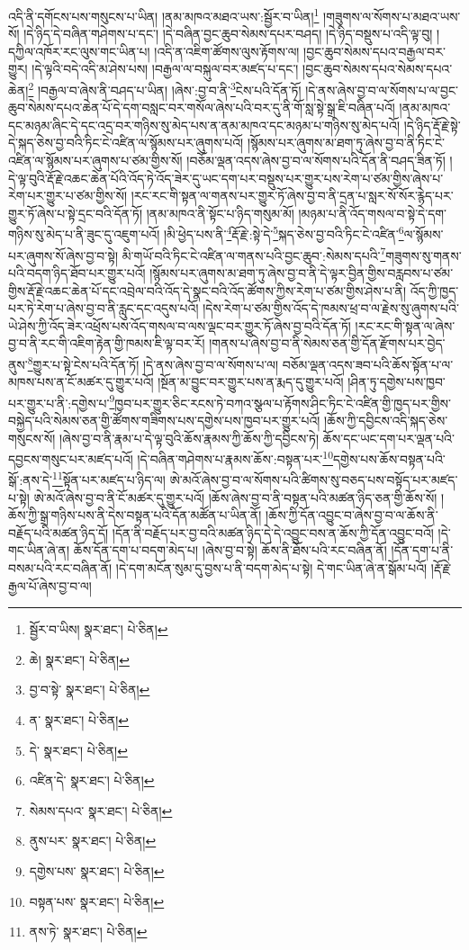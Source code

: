 འདི་ནི་དགོངས་པས་གསུངས་པ་ཡིན། །ནམ་མཁའ་མཐའ་ཡས་:སྦྱོར་བ་ཡིན།\footnote{སྦྱོར་བ་ཡིས།  སྣར་ཐང་།  པེ་ཅིན། } །གཟུགས་ལ་སོགས་པ་མཐའ་ཡས་སོ། །དེ་ཉིད་དེ་བཞིན་གཤེགས་པ་དང་། །དེ་བཞིན་བྱང་ཆུབ་སེམས་དཔར་བཤད། །དེ་ཉིད་བསྡུས་པ་འདི་ལྟ་བུ། །དཀྱིལ་འཁོར་རང་ལུས་གང་ཡིན་པ། །འདི་ན་འཇིག་ཚོགས་ལུས་རྟོགས་ལ། །བྱང་ཆུབ་སེམས་དཔའ་བརྒྱལ་བར་གྱུར། །དེ་ལྟའི་བདེ་འདི་མ་ཤེས་པས། །བརྒྱལ་ལ་བསྐུལ་བར་མཛད་པ་དང་། །བྱང་ཆུབ་སེམས་དཔའ་སེམས་དཔའ་ཆེན།\footnote{ཆེ།  སྣར་ཐང་།  པེ་ཅིན། } །བརྒྱལ་བ་ཞེས་ནི་བཤད་པ་ཡིན། །ཞེས་:བྱ་བ་ནི་\footnote{བྱ་བ་སྟེ་  སྣར་ཐང་།  པེ་ཅིན། }ངེས་པའི་དོན་ཏོ། །དེ་ནས་ཞེས་བྱ་བ་ལ་སོགས་པ་ལ་བྱང་ཆུབ་སེམས་དཔའ་ཆེན་པོ་དེ་དག་བསླང་བར་གསོལ་ཞེས་པའི་བར་དུ་ནི་གོ་སླ་སྟེ་སྒྲ་ཇི་བཞིན་པའོ། །ནམ་མཁའ་དང་མཉམ་ཞིང་དེ་དང་འདྲ་བར་གཉིས་སུ་མེད་པས་ན་ནམ་མཁའ་དང་མཉམ་པ་གཉིས་སུ་མེད་པའོ། །དེ་ཉིད་རྡོ་རྗེ་སྟེ་དེ་སྐད་ཅེས་བྱ་བའི་ཏིང་ངེ་འཛིན་ལ་སྙོམས་པར་ཞུགས་པའོ། །སྙོམས་པར་ཞུགས་མ་ཐག་ཏུ་ཞེས་བྱ་བ་ནི་ཏིང་ངེ་འཛིན་ལ་སྙོམས་པར་ཞུགས་པ་ཙམ་གྱིས་སོ། །བཅོམ་ལྡན་འདས་ཞེས་བྱ་བ་ལ་སོགས་པའི་དོན་ནི་བཤད་ཟིན་ཏོ། །དེ་ལྟ་བུའི་རྡོ་རྗེ་འཆང་ཆེན་པོའི་འོད་ཏེ་འོད་ཟེར་དུ་ཡང་དག་པར་བསྡུས་པར་གྱུར་པས་རེག་པ་ཙམ་གྱིས་ཞེས་པ་རེག་པར་གྱུར་པ་ཙམ་གྱིས་སོ། །རང་རང་གི་སྟན་ལ་གནས་པར་གྱུར་ཏོ་ཞེས་བྱ་བ་ནི་དྲན་པ་སླར་སོ་སོར་རྙེད་པར་གྱུར་ཏོ་ཞེས་པ་སྟེ་དྲང་བའི་དོན་ཏོ། །ནམ་མཁའ་ནི་སྟོང་པ་ཉིད་གསུམ་མོ། །མཉམ་པ་ནི་འོད་གསལ་བ་སྟེ་དེ་དག་གཉིས་སུ་མེད་པ་ནི་ཟུང་དུ་འཇུག་པའོ། །མི་ཕྱེད་པས་ནི་\footnote{ན་  སྣར་ཐང་།  པེ་ཅིན། }རྡོ་རྗེ་:སྟེ་དེ་\footnote{དེ་  སྣར་ཐང་།  པེ་ཅིན། }སྐད་ཅེས་བྱ་བའི་ཏིང་ངེ་འཛིན་\footnote{འཛིན་དེ་  སྣར་ཐང་།  པེ་ཅིན། }ལ་སྙོམས་པར་ཞུགས་སོ་ཞེས་བྱ་བ་སྟེ། མི་གཡོ་བའི་ཏིང་ངེ་འཛིན་ལ་གནས་པའི་བྱང་ཆུབ་:སེམས་དཔའི་\footnote{སེམས་དཔའ་  སྣར་ཐང་།  པེ་ཅིན། }གཟུགས་སུ་གནས་པའི་བདག་ཉིད་ཐོབ་པར་གྱུར་པའོ། །སྙོམས་པར་ཞུགས་མ་ཐག་ཏུ་ཞེས་བྱ་བ་ནི་དེ་ལྟར་བྱིན་གྱིས་བརླབས་པ་ཙམ་གྱིས་རྡོ་རྗེ་འཆང་ཆེན་པོ་དང་འབྲེལ་བའི་འོད་དེ་སྣང་བའི་འོད་ཚོགས་ཀྱིས་རེག་པ་ཙམ་གྱིས་ཤེས་པ་ནི། འོད་ཀྱི་ཁྱད་པར་ཏེ་རེག་པ་ཞེས་བྱ་བ་ནི་རླུང་དང་འདུས་པའོ། །དེས་རེག་པ་ཙམ་གྱིས་འོད་དེ་ཁམས་ཕྲ་བ་ལ་རྗེས་སུ་ཞུགས་པའི་ཡེ་ཤེས་ཀྱི་འོད་ཟེར་འཕྲོས་པས་འོད་གསལ་བ་ལས་ལྡང་བར་གྱུར་ཏོ་ཞེས་བྱ་བའི་དོན་ཏོ། །རང་རང་གི་སྟན་ལ་ཞེས་བྱ་བ་ནི་རང་གི་འཇིག་རྟེན་གྱི་ཁམས་ཇི་ལྟ་བར་རོ། །གནས་པ་ཞེས་བྱ་བ་ནི་སེམས་ཅན་གྱི་དོན་རྫོགས་པར་བྱེད་ནུས་\footnote{ནུས་པར་  སྣར་ཐང་།  པེ་ཅིན། }གྱུར་པ་སྟེ་ངེས་པའི་དོན་ཏོ། །དེ་ནས་ཞེས་བྱ་བ་ལ་སོགས་པ་ལ། བཅོམ་ལྡན་འདས་ཟབ་པའི་ཆོས་སྟོན་པ་ལ་མཁས་པས་ན་ངོ་མཚར་དུ་གྱུར་པའོ། །སྔོན་མ་བྱུང་བར་གྱུར་པས་ན་རྨད་དུ་གྱུར་པའོ། །ཤིན་ཏུ་དགྱེས་པས་ཁྱབ་པར་གྱུར་པ་ནི་:དགྱེས་པ་\footnote{དགྱེས་པས་  སྣར་ཐང་།  པེ་ཅིན། }ཁྱབ་པར་གྱུར་ཅིང་རངས་ཏེ་བཀའ་སྩལ་པ་རྟོགས་ཤིང་ཏིང་ངེ་འཛིན་གྱི་ཁྱད་པར་གྱིས་བསྐྱེད་པའི་སེམས་ཅན་གྱི་ཚོགས་གཟིགས་པས་དགྱེས་པས་ཁྱབ་པར་གྱུར་པའོ། །ཆོས་ཀྱི་དབྱིངས་འདི་སྐད་ཅེས་གསུངས་སོ། །ཞེས་བྱ་བ་ནི་རྣམ་པ་དེ་ལྟ་བུའི་ཆོས་རྣམས་ཀྱི་ཆོས་ཀྱི་དབྱིངས་ཏེ། ཆོས་དང་ཡང་དག་པར་ལྡན་པའི་དབྱངས་གསུང་པར་མཛད་པའོ། །དེ་བཞིན་གཤེགས་པ་རྣམས་ཆོས་:བསྟན་པར་\footnote{བསྟན་པས་  སྣར་ཐང་།  པེ་ཅིན། }དགྱེས་པས་ཆོས་བསྟན་པའི་སྒོ་:ནས་དེ་\footnote{ནས་ཏེ་  སྣར་ཐང་།  པེ་ཅིན། }སྟོན་པར་མཛད་པ་ཉིད་ལ། ཨེ་མའོ་ཞེས་བྱ་བ་ལ་སོགས་པའི་ཚིགས་སུ་བཅད་པས་བསྟོད་པར་མཛད་པ་སྟེ། ཨེ་མའོ་ཞེས་བྱ་བ་ནི་ངོ་མཚར་དུ་གྱུར་པའོ། །ཆོས་ཞེས་བྱ་བ་ནི་བསྟན་པའི་མཚན་ཉིད་ཅན་གྱི་ཆོས་སོ། །ཆོས་ཀྱི་སྒྲ་གཉིས་པས་ནི་དེས་བསྟན་པའི་དོན་མཚོན་པ་ཡིན་ནོ། །ཆོས་ཀྱི་དོན་འབྱུང་བ་ཞེས་བྱ་བ་ལ་ཆོས་ནི་བརྗོད་པའི་མཚན་ཉིད་དོ། །དོན་ནི་བརྗོད་པར་བྱ་བའི་མཚན་ཉིད་དེ་དེ་འབྱུང་བས་ན་ཆོས་ཀྱི་དོན་འབྱུང་བའོ། །དེ་གང་ཡིན་ཞེ་ན། ཆོས་དོན་དག་པ་བདག་མེད་པ། །ཞེས་བྱ་བ་སྟེ། ཆོས་ནི་ཐོས་པའི་རང་བཞིན་ནོ། །དོན་དག་པ་ནི་བསམ་པའི་རང་བཞིན་ནོ། །དེ་དག་མངོན་སུམ་དུ་བྱས་པ་ནི་བདག་མེད་པ་སྟེ། དེ་གང་ཡིན་ཞེ་ན་སྒོམ་པའོ། །རྡོ་རྗེ་རྒྱལ་པོ་ཞེས་བྱ་བ་ལ། 